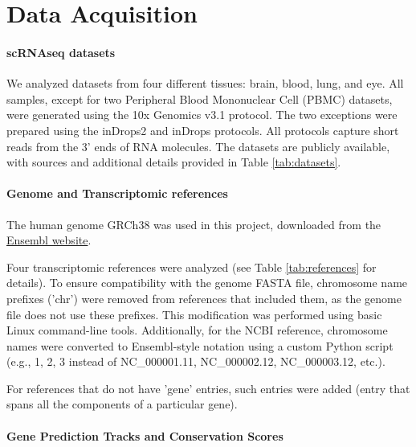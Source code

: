 \section{Data Acquisition}

\paragraph{\textbf{scRNAseq datasets}}

We analyzed datasets from four different tissues: brain, blood, lung, and eye.
All samples, except for two Peripheral Blood Mononuclear Cell (PBMC) datasets, were generated using the 10x Genomics v3.1 protocol.
The two exceptions were prepared using the inDrops2 and inDrops protocols.
All protocols capture short reads from the 3' ends of RNA molecules.
The datasets are publicly available, with sources and additional details provided in Table \ref{tab:datasets}.



\paragraph{\textbf{Genome and Transcriptomic references}}

The human genome GRCh38 was used in this project, downloaded from the \href{https://ftp.ensembl.org/pub/release-113/fasta/homo_sapiens/dna/}{Ensembl website}.

Four transcriptomic references were analyzed (see Table \ref{tab:references} for details).
To ensure compatibility with the genome FASTA file, chromosome name prefixes ('chr') were removed from references that included them,
as the genome file does not use these prefixes.
This modification was performed using basic Linux command-line tools.
Additionally, for the NCBI reference, chromosome names were converted to Ensembl-style notation using a custom Python script
(e.g., 1, 2, 3 instead of NC\_000001.11, NC\_000002.12, NC\_000003.12, etc.).

For references that do not have 'gene' entries, such entries were added
(entry that spans all the components of a particular gene).



\paragraph{\textbf{Gene Prediction Tracks and Conservation Scores}}

